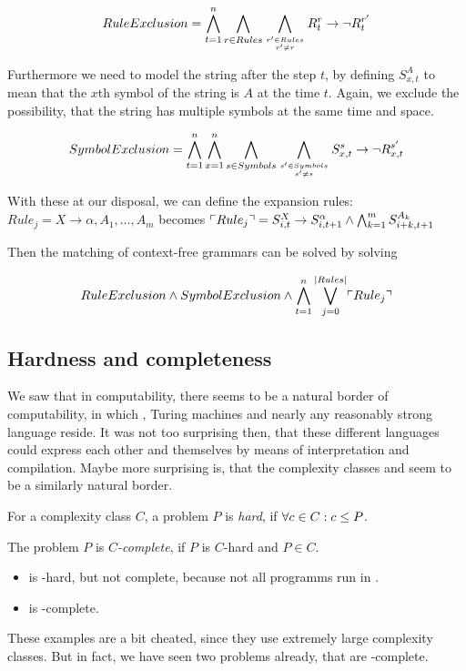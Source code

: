 \[ RuleExclusion = \bigwedge_{t=1}^{n}\bigwedge_{r\in Rules} \bigwedge_{r'\in Rules\atop r'\neq r} R_t^r \rightarrow \lnot R_t^{r'}\]

Furthermore we need to model the string after the step $t$, by defining 
$S^A_{x,t}$ to mean that the $x$th symbol of the string is $A$ at the time $t$. 
Again, we exclude the possibility, that the string has multiple symbols at 
the same time and space.

\[ SymbolExclusion = \bigwedge_{t=1}^{n}\bigwedge_{x=1}^{n}\bigwedge_{s\in Symbols} \bigwedge_{s'\in Symbols\atop s'\neq s} S_{x,t}^s \rightarrow \lnot R_{x,t}^{s'}\]

With these at our disposal, we can define the expansion rules: 
$Rule_j = X \rightarrow \alpha, A_1, \ldots, A_m$ becomes 
$\ulcorner Rule_j \urcorner = S^X_{i,t}\rightarrow S^\alpha_{i,t+1}\wedge \bigwedge_{k=1}^m S^{A_k}_{i+k, t+1}$

Then the matching of context-free grammars can be solved by solving

\[ RuleExclusion \wedge SymbolExclusion \wedge \bigwedge_{t=1}^{n}\bigvee_{j = 0}^{\left|Rules\right|} \ulcorner Rule_j \urcorner \]

\subsection{Hardness and completeness}
We saw that in computability, there seems to be a natural border of 
computability, in which \WHILE, Turing machines and nearly any reasonably 
strong language reside. It was not too surprising then, that these different 
languages could express each other and themselves by means of interpretation and
compilation. Maybe more surprising is, that the complexity classes \PTIME and 
\NPTIME seem to be a similarly natural border.

\begin{defn}
	For a complexity class $C$, a problem $P$ is \emph{hard}, if 
	$\forall c\in C: c \leq P$.

	The problem $P$ is \emph{$C$-complete}, if $P$ is $C$-hard and $P\in C$.
\end{defn}
\begin{example}
	\begin{itemize}
		\item \FOR is \PTIME-hard, but not complete, because not all \FOR programms run in \PTIME.
		\item \TM is \WHILE-complete.
	\end{itemize}
\end{example}
These examples are a bit cheated, since they use extremely large complexity 
classes. But in fact, we have seen two problems already, that are \NPTIME-complete.


